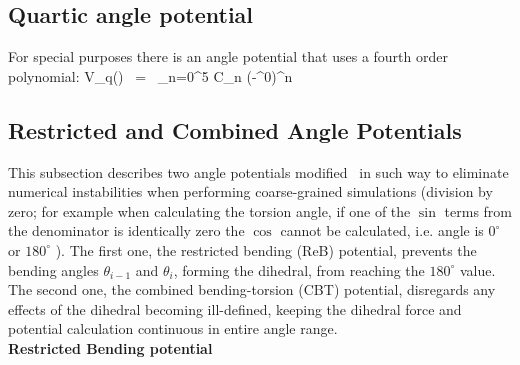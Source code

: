 \subsection{Quartic angle potential}
\label{subsec:quarticangle}
For special purposes there is an angle potential
that uses a fourth order polynomial:
\beq
V_q(\tijk) ~=~ \sum_{n=0}^5 C_n (\tijk-\tijk^0)^n
\eeq

\newcommand{\rvkj}{{\bf r}_{kj}}
\newcommand{\rkj}{r_{kj}}
\subsection{Restricted and  Combined Angle Potentials}
\label{subsec:improvedanglepotential}
This subsection describes two angle potentials modified~\cite{MonicaGoga2013} in such way to eliminate numerical instabilities when performing coarse-grained simulations (division by zero; for example when calculating the torsion angle,
if one of the $\sin$ terms from the denominator is identically zero the $\cos$ cannot be calculated, i.e. angle is  $0^{\circ}$ or $180^{\circ}$ ).
The first one, the restricted bending (ReB) potential, prevents the bending angles $\theta_{i-1}$ and $\theta_{i}$,
forming the dihedral, from reaching the $180^{\circ}$ value.
The second one, the combined bending-torsion (CBT) potential, disregards any effects of the dihedral becoming ill-defined,
keeping the dihedral force and potential calculation continuous in entire angle range. \\
%
\textbf{Restricted Bending potential}

